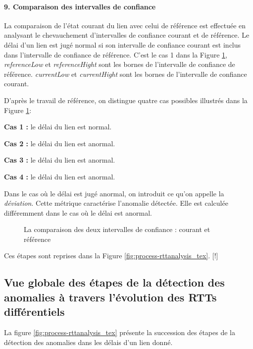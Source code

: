  \paragraph{9. Comparaison des intervalles de confiance} 

La comparaison de l'état courant du lien avec celui de référence est effectuée en analysant le chevauchement d'intervalles de confiance  courant et de référence. Le délai d'un lien est jugé normal si son intervalle de confiance courant est inclus dans l'intervalle de confiance de référence. C'est le cas 1 dans la Figure 	\ref{fig:intervals-comparaison},  \textit{referenceLow} et \textit{referenceHight} sont les bornes de l'intervalle de confiance de référence.  \textit{currentLow} et \textit{currentHight} sont les bornes de l'intervalle de confiance courant.

D'après le travail de référence, on distingue quatre cas possibles  illustrés dans la Figure 	\ref{fig:intervals-comparaison}:

\textbf{Cas 1 :} le délai du lien est normal.

\textbf{Cas 2 :} le délai du lien est anormal.

\textbf{Cas 3 :} le délai du lien est anormal.

\textbf{Cas 4 :} le délai du lien est anormal.

Dans le cas où le délai est jugé anormal, on introduit ce qu'on appelle la \textit{déviation}. Cette métrique caractérise l'anomalie détectée. Elle est calculée différemment dans le cas où le délai est anormal.

\begin{figure}[h]
	\centering
	\captionsetup{justification=centering}
	\resizebox{\textwidth}{!}{
		
	}
	\caption{La comparaison des deux intervalles de confiance : courant et référence }
	\label{fig:intervals-comparaison}
\end{figure}

  Ces étapes sont reprises dans  la Figure \ref{fig:process-rttanalysis_tex}. [!]


\subsection{Vue globale des étapes de la détection des anomalies à travers l'évolution des RTTs différentiels}
La figure 	\ref{fig:process-rttanalysis_tex} présente la succession des étapes de la détection des anomalies dans les délais d'un lien donné. 


